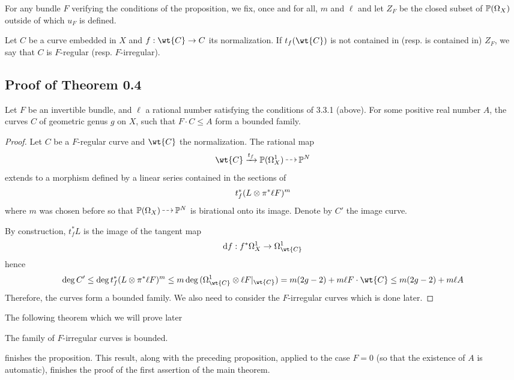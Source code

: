 \documentclass[main.tex]{subfiles}
\begin{document}
For any bundle $F$ verifying the conditions of the proposition, we fix, once and for all, $m$ and $\ell$ and let $Z_F$ be the closed subset of $\P(\Omega_X)$ outside of which $u_F$ is defined.

\begin{defn}
Let $C$ be a curve embedded in $X$ and $f : \wt{C} \to C$ its normalization. If $t_f(\wt{C})$ is not contained in (resp. is contained in) $Z_F$, we say that $C$ is $F$-regular (resp. $F$-irregular).
\end{defn}

\subsection{Proof of Theorem 0.4}

\begin{prop}
Let $F$ be an invertible bundle, and $\ell$ a rational number satisfying the conditions of 3.3.1 (above). For some positive real number $A$, the curves $C$ of geometric genus $g$ on $X$, such that $F \cdot C \le A$ form a bounded family.
\end{prop}

\begin{proof}
Let $C$ be a $F$-regular curve and $\wt{C}$ the normalization. The rational map
\[ \wt{C} \xrightarrow{t_f} \P(\Omega_X^1) \rat \P^N \]
extends to a morphism defined by a linear series contained in the sections of
\[ t_f^*(L \ot \pi^* \ell F)^m \]
where $m$ was chosen before so that $\P(\Omega_X) \rat \P^N$ is birational onto its image. Denote by $C'$ the image curve.
\par
By construction, $t_f^* L$ is the image of the tangent map
\[ \d{f} : f^* \Omega_X^1 \to \Omega_{\wt{C}}^1 \]
hence
\[ \deg{C'} \le \deg{t_f^*(L \ot \pi^* \ell F)^m} \le m \deg{(\Omega^1_{\wt{C}} \ot \ell F|_{\wt{C}})} = m (2g - 2) + m \ell F \cdot \wt{C} \le m (2g - 2) + m \ell A \]
Therefore, the curves form a bounded family. We also need to consider the $F$-irregular curves which is done later.
\end{proof}

The following theorem which we will prove later

\begin{theorem}[Bogomolov]
The family of $F$-irregular curves is bounded.
\end{theorem}

finishes the proposition. This result, along with the preceding proposition, applied to the case $F = 0$ (so that the existence of $A$ is automatic), finishes the proof of the first assertion of the main theorem.
\end{document}
